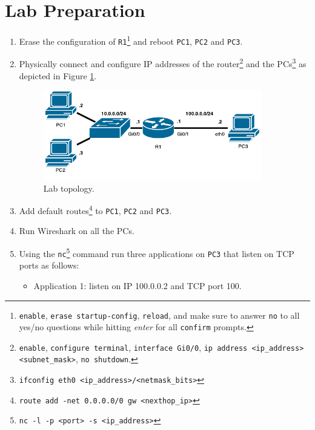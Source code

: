 \documentclass[pdftex,12pt,a4paper]{article}
\begin{document}
    \section{Lab Preparation}
        \begin{enumerate}
            \item Erase the configuration of
                \texttt{R1}\footnote{\texttt{enable}, \texttt{erase
                startup-config}, \texttt{reload}, and make sure to answer
                \texttt{no} to all yes/no questions while hitting \emph{enter} for
                all \texttt{confirm} prompts.} and reboot \texttt{PC1},
                \texttt{PC2} and \texttt{PC3}.
            \item Physically connect and configure IP addresses of the
                router\footnote{\texttt{enable}, \texttt{configure terminal},
                \texttt{interface Gi0/0}, \texttt{ip address <ip\_address>
                <subnet\_mask>}, \texttt{no shutdown}.} and the
                PCs\footnote{\texttt{ifconfig eth0
                <ip\_address>/<netmask\_bits>}} as depicted in Figure
                \ref{fig:labtop}.

                \begin{figure}[tbh]
                    \centering
                    \includegraphics[width=0.9\textwidth]{figures/npat}
                    \caption{Lab topology.}
                    \label{fig:labtop}
                \end{figure}

           \item Add default routes\footnote{\texttt{route add -net
               0.0.0.0/0 gw <nexthop\_ip>}} to \texttt{PC1}, \texttt{PC2} and \texttt{PC3}.

           \item Run Wireshark on all the PCs.

           \item Using the \texttt{nc}\footnote{\texttt{nc -l -p <port> -s
               <ip\_address>}} command run three applications on \texttt{PC3} that
               listen on TCP ports as follows:
                \begin{itemize}
                    \item Application 1: listen on IP 100.0.0.2 and TCP port 100.
                \end{itemize}


\end{enumerate}
\end{document}
